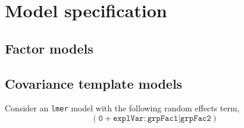 \documentclass[12pt]{article}\usepackage[]{graphicx}\usepackage[]{color}
\begin{document}
\section{Model specification}

\subsection{Factor models}

\subsection{Covariance template models}

Consider an \texttt{lmer} model with the following random effects term,
\begin{equation}
  \label{eq:9}
  \mathtt{(0 + explVar:grpFac1 | grpFac2)}
\end{equation}
\end{document}
